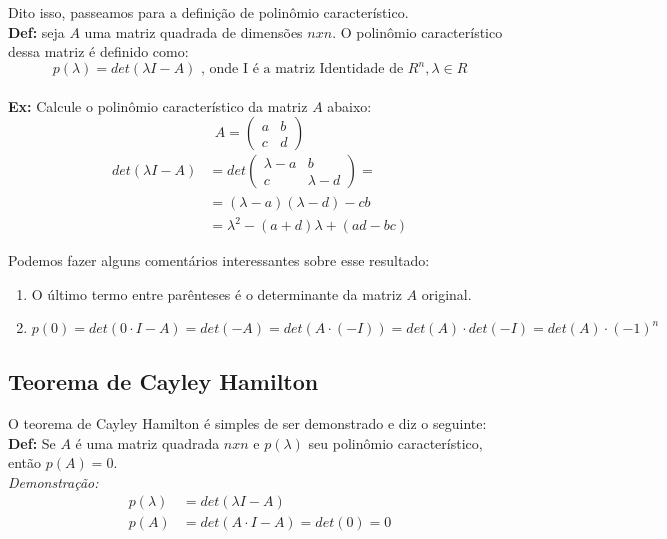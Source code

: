 \documentclass[12pt]{article}
\begin{document}
Dito isso, passeamos para a definição de polinômio característico.\\

\textbf{Def:} seja $A$ uma matriz quadrada de dimensões $nxn$. O polinômio característico dessa matriz é definido como:
\begin{equation*}
	p(\lambda)=det(\lambda I-A)\mbox{ , onde I é a matriz Identidade de }R^n, \lambda \in R
\end{equation*}\\

\textbf{Ex:} Calcule o polinômio característico da matriz $A$ abaixo:
\begin{equation*}
	A=\begin{pmatrix}
		a&b\\
		c&d
	\end{pmatrix}
\end{equation*}
\begin{align*}
	det(\lambda I-A)&=det
	\begin{pmatrix}
		\lambda-a&b\\
		c&\lambda-d
	\end{pmatrix}=\\
	&= (\lambda-a)(\lambda-d)-cb\\
	&= \lambda^2 -(a+d)\lambda+(ad-bc)
\end{align*}

Podemos fazer alguns comentários interessantes sobre esse resultado:
\begin{enumerate}
	\item O último termo entre parênteses é o determinante da matriz $A$ original.
	\item $p(0)=det(0\cdot I-A)=det(-A)=det(A\cdot(-I))=det(A)\cdot det(-I)=det(A)\cdot(-1)^n$
\end{enumerate}

\subsection{Teorema de Cayley Hamilton}

O teorema de Cayley Hamilton é simples de ser demonstrado e diz o seguinte:\\

\textbf{Def:} Se $A$ é uma matriz quadrada $nxn$ e $p(\lambda)$ seu polinômio característico, então $p(A)=0$.\\

\textit{Demonstração:}
\begin{align*}
	p(\lambda)&=det(\lambda I-A)\\
	p(A)&=det(A\cdot I-A)=det(0)=0
\end{align*}
\end{document}
